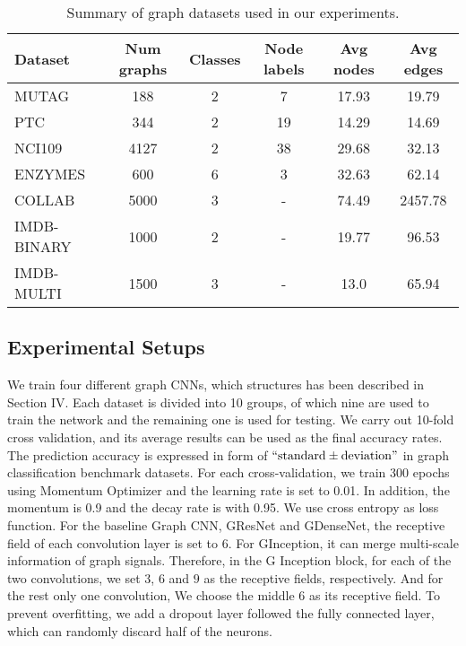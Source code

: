 \documentclass[journal]{IEEEtran}
\begin{document}
\begin{table*}[!t]
\centering
	\renewcommand\arraystretch{1.3}
	\caption{Summary of graph datasets used in our experiments.}
\footnotesize
	\begin{tabular}[width=0.8\linewidth]{l|ccccc} \hline  Dataset & Num graphs &Classes  &Node labels &Avg nodes &Avg edges \\
		\hline
		MUTAG \cite{mutag}   &188  &2 &7  &17.93 &19.79\\
		PTC \cite{ptc}     &344  &2 &19 &14.29 &14.69 \\
NCI109 \cite{nci1andnci109}   &4127 &2 &38 &29.68 &32.13\\
		ENZYMES \cite{enzymes}  &600  &6 &3  &32.63 &62.14\\
\hline
		COLLAB \cite{deepgraphkerner}         &5000  &3  &-  &74.49   &2457.78\\
		IMDB-BINARY \cite{deepgraphkerner}     &1000  &2  &-  &19.77   &96.53  \\
		IMDB-MULTI \cite{deepgraphkerner}     &1500  &3  &-  &13.0    &65.94 \\
\hline
	\end{tabular} \vspace{0.15cm}
	
	\label{tab1} \vspace{-0.1cm}
\end{table*}


\subsection{Experimental Setups}
We train four different graph CNNs, which structures has been described in Section IV. Each dataset is divided into 10 groups, of which nine are used to train the network and the remaining one is used for testing.
We carry out 10-fold cross validation, and its average results can be used as the final accuracy rates.
The prediction accuracy is expressed in form of $``\text{standard} \pm \text{deviation}"$ in graph classification benchmark datasets.
For each cross-validation, we train 300 epochs using Momentum Optimizer and the learning rate is set to 0.01. In addition, the momentum is 0.9 and the decay rate is with 0.95. We use cross entropy as loss function.
For the baseline Graph CNN, G\underline{\hspace{0.5em}}ResNet and G\underline{\hspace{0.5em}}DenseNet, the receptive field of each convolution layer is set to $6$.
For G\underline{\hspace{0.5em}}Inception, it can merge multi-scale information of graph signals. Therefore, in the G\underline{\hspace{0.5em}} Inception block, for each of the two convolutions, we set $3$, $6$ and $9$ as the receptive fields, respectively. And for the rest only one convolution, We choose the middle $6$ as its receptive field. To prevent overfitting, we add a dropout layer followed the fully connected layer, which can randomly discard half of the neurons.
\end{document}

